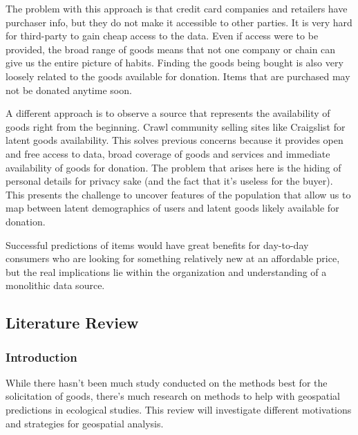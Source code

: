 \documentclass[12pt]{article}
\begin{document}
   The problem with this approach is that credit card companies and retailers have purchaser info, but they do not make it accessible to other parties. It is very hard for third-party to gain cheap access to the data. Even if access were to be provided, the broad range of goods means that not one company or chain can give us the entire picture of habits. Finding the goods being bought is also very loosely related to the goods available for donation. Items that are purchased may not be donated anytime soon.

   A different approach is to observe a source that represents the availability of goods right from the beginning. Crawl community selling sites like Craigslist for latent goods availability. This solves previous concerns because it provides open and free access to data, broad coverage of goods and services and immediate availability of goods for donation. The problem that arises here is the hiding of personal details for privacy sake (and the fact that it's useless for the buyer). This presents the challenge to uncover features of the population that allow us to map between latent demographics of users and latent goods likely available for donation. 

   Successful predictions of items would have great benefits for day-to-day consumers who are looking for something relatively new at an affordable price, but the real implications lie within the organization and understanding of a monolithic data source.

   \subsection{Literature Review}
      
   \subsubsection{Introduction}
   While there hasn't been much study conducted on the methods best for the solicitation of goods, there's much research on methods to help with geospatial predictions in ecological studies. This review will investigate different motivations and strategies for geospatial analysis. 
\end{document}
